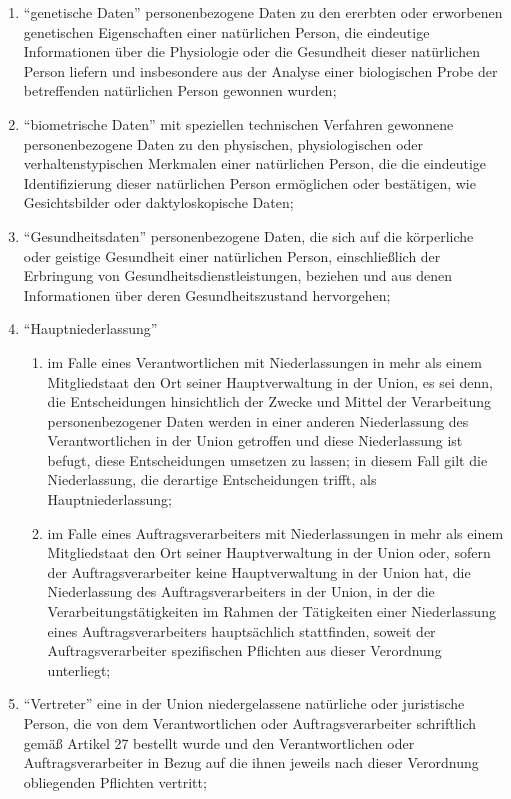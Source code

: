 \documentclass[A4, 12pt]{scrbook}
\begin{document}
\begin{enumerate}[label=\arabic*.]
            \item ``genetische Daten'' personenbezogene Daten zu den ererbten oder erworbenen genetischen Eigenschaften einer natürlichen Person, die eindeutige Informationen über die Physiologie oder die Gesundheit dieser natürlichen Person liefern und insbesondere aus der Analyse einer biologischen Probe der betreffenden natürlichen Person gewonnen wurden;
            \item ``biometrische Daten'' mit speziellen technischen Verfahren gewonnene personenbezogene Daten zu den physischen, physiologischen oder verhaltenstypischen Merkmalen einer natürlichen Person, die die eindeutige Identifizierung dieser natürlichen Person ermöglichen oder bestätigen, wie Gesichtsbilder oder daktyloskopische Daten;
            \item ``Gesundheitsdaten'' personenbezogene Daten, die sich auf die körperliche oder geistige Gesundheit einer natürlichen Person, einschließlich der Erbringung von Gesundheitsdienstleistungen, beziehen und aus denen Informationen über deren Gesundheitszustand hervorgehen;
            \item ``Hauptniederlassung''
                \begin{enumerate}[label=\alph*)]
                    \item im Falle eines Verantwortlichen mit Niederlassungen in mehr als einem Mitgliedstaat den Ort seiner Hauptverwaltung in der Union, es sei denn, die Entscheidungen hinsichtlich der Zwecke und Mittel der Verarbeitung personenbezogener Daten werden in einer anderen Niederlassung des Verantwortlichen in der Union getroffen und diese Niederlassung ist befugt, diese Entscheidungen umsetzen zu lassen; in diesem Fall gilt die Niederlassung, die derartige Entscheidungen trifft, als Hauptniederlassung;
                    \item im Falle eines Auftragsverarbeiters mit Niederlassungen in mehr als einem Mitgliedstaat den Ort seiner Hauptverwaltung in der Union oder, sofern der Auftragsverarbeiter keine Hauptverwaltung in der Union hat, die Niederlassung des Auftragsverarbeiters in der Union, in der die Verarbeitungstätigkeiten im Rahmen der Tätigkeiten einer Niederlassung eines Auftragsverarbeiters hauptsächlich stattfinden, soweit der Auftragsverarbeiter spezifischen Pflichten aus dieser Verordnung unterliegt;
                \end{enumerate} 
            \item ``Vertreter'' eine in der Union niedergelassene natürliche oder juristische Person, die von dem Verantwortlichen oder Auftragsverarbeiter schriftlich gemäß Artikel 27 bestellt wurde und den Verantwortlichen oder Auftragsverarbeiter in Bezug auf die ihnen jeweils nach dieser Verordnung obliegenden Pflichten vertritt;

\end{enumerate}
\end{document}
